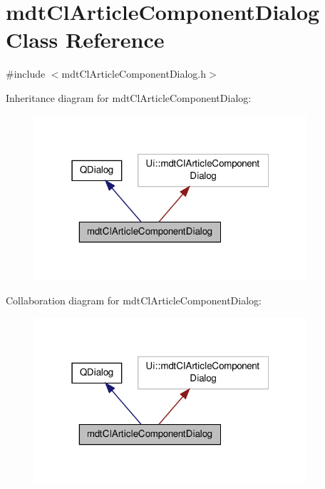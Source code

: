\hypertarget{classmdt_cl_article_component_dialog}{\section{mdt\-Cl\-Article\-Component\-Dialog Class Reference}
\label{classmdt_cl_article_component_dialog}
}


{\ttfamily \#include $<$mdt\-Cl\-Article\-Component\-Dialog.\-h$>$}



Inheritance diagram for mdt\-Cl\-Article\-Component\-Dialog\-:\nopagebreak
\begin{figure}[H]
\begin{center}
\leavevmode
\includegraphics[width=286pt]{classmdt_cl_article_component_dialog__inherit__graph}
\end{center}
\end{figure}


Collaboration diagram for mdt\-Cl\-Article\-Component\-Dialog\-:\nopagebreak
\begin{figure}[H]
\begin{center}
\leavevmode
\includegraphics[width=286pt]{classmdt_cl_article_component_dialog__coll__graph}
\end{center}
\end{figure}
